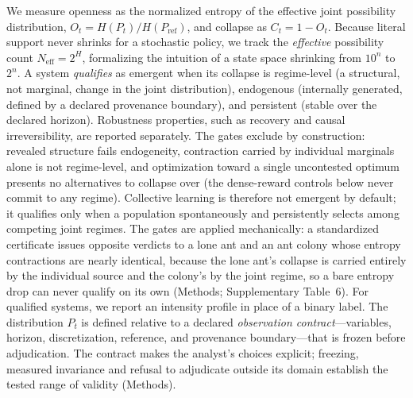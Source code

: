\documentclass[11pt]{article}
\begin{document}
We measure openness as the normalized entropy of the effective joint
possibility distribution, $O_t = H(P_t)/H(P_\mathrm{ref})$, and collapse
as $C_t = 1 - O_t$. Because literal support never shrinks for a
stochastic policy, we track the \emph{effective} possibility count
$N_\mathrm{eff}=2^{H}$, formalizing the intuition of a state space
shrinking from $10^n$ to $2^n$. A system \emph{qualifies} as emergent
when its collapse is regime-level (a structural, not marginal, change
in the joint distribution), endogenous (internally generated, defined
by a declared provenance boundary), and persistent (stable over the
declared horizon). Robustness properties, such as recovery and causal
irreversibility, are reported separately. The gates exclude by
construction: revealed structure fails endogeneity, contraction
carried by individual marginals alone is not regime-level, and
optimization toward a single uncontested optimum presents no
alternatives to collapse over (the dense-reward controls below never
commit to any regime). Collective learning is therefore not emergent
by default; it qualifies only when a population spontaneously and
persistently selects among competing joint regimes. The gates are
applied mechanically: a standardized certificate issues opposite
verdicts to a lone ant and an ant colony whose entropy contractions
are nearly identical, because the lone ant's collapse is carried
entirely by the individual source and the colony's by the joint
regime, so a bare entropy drop can never qualify on its own (Methods;
Supplementary Table~6). For qualified
systems, we report an intensity profile in place of a binary label. The
distribution $P_t$ is defined relative to a declared \emph{observation
contract}---variables, horizon, discretization, reference, and
provenance boundary---that is frozen before adjudication. The contract
makes the analyst's choices explicit; freezing, measured invariance
and refusal to adjudicate outside its domain establish the tested
range of validity (Methods).
\end{document}
